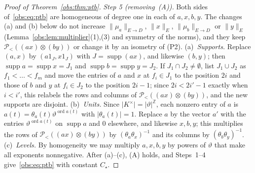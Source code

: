 \documentclass[11pt]{amsart}
\theoremstyle{definition}
\theoremstyle{remark}
\numberwithin{equation}{section}
\newcommand{\Z}{\mathbb Z}
\newcommand{\abs}[1]{\lvert #1\rvert}
\newcommand{\norm}[1]{\lVert #1\rVert}
\newcommand{\ord}{\operatorname{ord}}
\theoremstyle{plain}
\theoremstyle{definition}
\theoremstyle{plain}
\newcommand{\cP}{\mathcal P}
\begin{document}
\begin{proof}[Proof of Theorem~\ref{obs:thm:ptb}]
\emph{Step 5 (removing~(A)).} Both sides of~\eqref{obs:eq:ptb} are homogeneous of degree one in each of $a,x,b,y$. The
changes (a) and (b) below do not increase $\norm{\mu_a}_{E\to D}$, $\norm x_E$, $\norm{\mu_b}_{E\to D}$ or $\norm y_E$
(Lemma~\ref{obs:lem:multiplier}(1),(3) and symmetry of the norms), and they keep $\cP_<((ax)\otimes(by))$ or change it by an
isometry of (P2).
(a)~\emph{Supports.} Replace $(a,x)$ by $(a1_J,x1_J)$ with $J=\operatorname{supp}(ax)$, and likewise $(b,y)$; then
$\operatorname{supp}a=\operatorname{supp}x=J_1$ and $\operatorname{supp}b=\operatorname{supp}y=J_2$. If
$J_1\cap J_2\ne\emptyset$, list $J_1\cup J_2$ as $f_1<\dots<f_m$ and move the entries of $a$ and $x$ at $f_i\in J_1$ to
the position $2i$ and those of $b$ and $y$ at $f_i\in J_2$ to the position $2i-1$; since $2i<2i'-1$ exactly when
$i<i'$, this relabels the rows and columns of $\cP_<((ax)\otimes(by))$, and the new supports are disjoint.
(b)~\emph{Units.} Since $\abs{K^\times}=\abs\vartheta^\Z$, each nonzero entry of $a$ is
$a(t)=\theta_a(t)\vartheta^{\ord a(t)}$ with $\abs{\theta_a(t)}=1$. Replace $a$ by the vector $a'$ with the entries
$\vartheta^{\ord a(t)}$ on $\operatorname{supp}a$ and $0$ elsewhere, and likewise $x,b,y$; this multiplies the rows of
$\cP_<((ax)\otimes(by))$ by $(\theta_a\theta_x)^{-1}$ and its columns by $(\theta_b\theta_y)^{-1}$.
(c)~\emph{Levels.} By homogeneity we may multiply $a,x,b,y$ by powers of $\vartheta$ that make all exponents
nonnegative.
After (a)--(c), (A) holds, and Steps~1--4 give~\eqref{obs:eq:ptb} with constant $C_\star$.
\end{proof}
\end{document}
